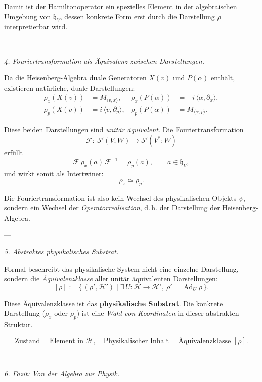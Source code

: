 \documentclass[10pt, letterpaper]{article}
\newcommand{\Ad}{\operatorname{Ad}}
\begin{document}
Damit ist der Hamiltonoperator ein spezielles Element in der algebraischen Umgebung von \(\mathfrak{h}_V\),
dessen konkrete Form erst durch die Darstellung \(\rho\) interpretierbar wird.

---

\emph{4. Fouriertransformation als Äquivalenz zwischen Darstellungen.}

Da die Heisenberg-Algebra duale Generatoren \(X(v)\) und \(P(\alpha)\) enthält,
existieren natürliche, duale Darstellungen:
\begin{align*}
\rho_x(X(v)) &= M_{\langle v,x\rangle}, & \rho_x(P(\alpha)) &= -i\,\langle \alpha,\partial_x\rangle,\\
\rho_p(X(v)) &= i\,\langle v,\partial_p\rangle, & \rho_p(P(\alpha)) &= M_{\langle \alpha,p\rangle}.
\end{align*}

Diese beiden Darstellungen sind \emph{unitär äquivalent}.  
Die Fouriertransformation
\[
\mathcal{F}:\ \mathcal{S}'(V;W)\longrightarrow\mathcal{S}'(V^\ast;W)
\]
erfüllt
\[
\mathcal{F}\,\rho_x(a)\,\mathcal{F}^{-1}=\rho_p(a),\qquad a\in\mathfrak{h}_V,
\]
und wirkt somit als Intertwiner:
\[
\rho_x \simeq \rho_p.
\]

Die Fouriertransformation ist also kein Wechsel des physikalischen Objekts \(\psi\),
sondern ein Wechsel der \emph{Operatorrealisation}, d.\,h. der Darstellung der Heisenberg-Algebra.

---

\emph{5. Abstraktes physikalisches Substrat.}

Formal beschreibt das physikalische System nicht eine einzelne Darstellung,
sondern die \emph{Äquivalenzklasse} aller unitär äquivalenten Darstellungen:
\[
[\rho] := \{\, (\rho',\mathcal{H}') \mid \exists\,U:\mathcal{H}\!\to\!\mathcal{H}',\ \rho'=\Ad_U\rho \,\}.
\]

Diese Äquivalenzklasse ist das \textbf{physikalische Substrat}.
Die konkrete Darstellung (\(\rho_x\) oder \(\rho_p\)) ist eine \emph{Wahl von Koordinaten}
in dieser abstrakten Struktur.

\[
\boxed{
\text{Zustand} = \text{Element in } \mathcal{H},\quad
\text{Physikalischer Inhalt} = \text{Äquivalenzklasse } [\rho].
}
\]

---

\emph{6. Fazit: Von der Algebra zur Physik.}
\end{document}
